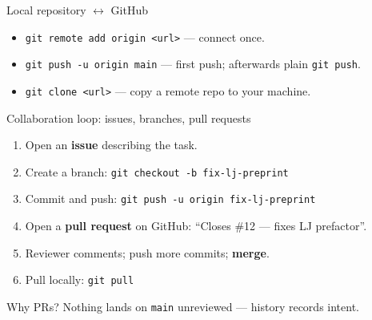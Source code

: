 \documentclass[aspectratio=169]{beamer}
\begin{document}
\begin{frame}{Local repository $\leftrightarrow$ GitHub}
  \begin{center}
  \end{center}
  \vspace{0.3cm}
  \begin{itemize}
    \item \texttt{git remote add origin <url>} --- connect once.
    \item \texttt{git push -u origin main} --- first push; afterwards plain \texttt{git push}.
    \item \texttt{git clone <url>} --- copy a remote repo to your machine.
  \end{itemize}
\end{frame}

\begin{frame}{Collaboration loop: issues, branches, pull requests}
  \begin{enumerate}
    \item Open an \textbf{issue} describing the task.
    \item Create a branch: \texttt{git checkout -b fix-lj-preprint}
    \item Commit and push: \texttt{git push -u origin fix-lj-preprint}
    \item Open a \textbf{pull request} on GitHub: ``Closes \#12 --- fixes LJ prefactor''.
    \item Reviewer comments; push more commits; \textbf{merge}.
    \item Pull locally: \texttt{git pull}
  \end{enumerate}
  \vspace{0.3cm}
  \begin{block}{Why PRs?}
    Nothing lands on \texttt{main} unreviewed --- history records intent.
  \end{block}
\end{frame}
\end{document}
